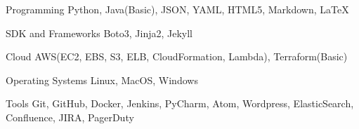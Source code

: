 

\begin{cvskills}

  \cvskill
    {Programming} %
    {Python, Java(Basic), JSON, YAML, HTML5, Markdown, LaTeX} %

  \cvskill
    {SDK and Frameworks} %
    {Boto3, Jinja2, Jekyll} %

  \cvskill
    {Cloud} %
    {AWS(EC2, EBS, S3, ELB, CloudFormation, Lambda), Terraform(Basic)} %


  \cvskill
    {Operating Systems} %
    {Linux, MacOS, Windows} %


  \cvskill
    {Tools} %
    {Git, GitHub, Docker, Jenkins, PyCharm, Atom, Wordpress, ElasticSearch, Confluence, JIRA, PagerDuty } %

\end{cvskills}
